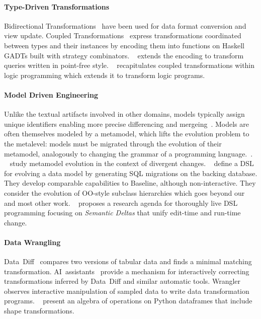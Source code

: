 \documentclass[english,submission]{programming}
\theoremstyle{definition}
\newcommand{\citet}[1]{\citeauthor*{#1}~\cite{#1}}
\begin{document}
\paragraph{Type-Driven Transformations}
 Bidirectional Transformations~\cite{czarnecki2009bidirectional} have been used for data format conversion and view update.
Coupled Transformations~\cite{Berdaguer07, alcino06, Cleve2006} express transformations coordinated between types and their instances by encoding them into functions on Haskell GADTs built with strategy combinators. \citet{JVisser08} extends the encoding to transform queries written in point-free style. \citet{lammel16} recapitulates coupled transformations within logic programming which extends it to transform logic programs.

\paragraph{Model Driven Engineering}
Unlike the textual artifacts involved in other domains, models typically assign unique identifiers enabling more precise differencing and mergeing~\cite{alanen2003}.
Models are often themselves modeled by a metamodel, which lifts the evolution problem to the metalevel: models must be migrated through the evolution of their metamodel, analogously to changing the grammar of a programming language.~\cite{Herrmannsdoerfer11}. \citet{Cicchetti11} study metamodel evolution in the context of divergent changes.
\citet{vermolen11} define a DSL for evolving a data model by generating SQL migrations on the backing database. They develop comparable capabilities to Baseline, although non-interactive. They consider the evolution of OO-style subclass hierarchies which goes beyond our and most other work.
\citet{SemanticDeltas} proposes a research agenda for thoroughly live DSL programming focusing on \emph{Semantic Deltas} that unify edit-time and run-time change.

\paragraph{Data Wrangling}
Data~Diff~\cite{sutton18} compares two versions of tabular data and finds a minimal matching transformation. AI~assistants~\cite{AIassistants} provide a mechanism for interactively correcting
transformations inferred by Data~Diff and similar automatic tools.
Wrangler~\cite{kandel11} observes interactive manipulation of sampled data to write data transformation programs.
\citet{petersohn20} present an algebra of operations on Python dataframes that include shape transformations.
\end{document}
